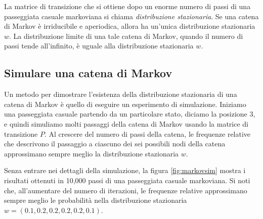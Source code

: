 \documentclass[
]{memoir}
\begin{document}
La matrice di transizione che si ottiene dopo un enorme numero di passi di una passeggiata casuale markoviana si chiama \emph{distribuzione stazionaria}. Se una catena di Markov è irriducibile e aperiodica, allora ha un'unica distribuzione stazionaria \(w\). La distribuzione limite di una tale catena di Markov, quando il numero di passi tende all'infinito, è uguale alla distribuzione stazionaria \(w\).

\hypertarget{simulare-una-catena-di-markov}{%
\subsection{Simulare una catena di Markov}\label{simulare-una-catena-di-markov}}

Un metodo per dimostrare l'esistenza della distribuzione stazionaria di una catena di Markov è quello di eseguire un esperimento di simulazione. Iniziamo una passeggiata casuale partendo da un particolare stato, diciamo la posizione 3, e quindi simuliamo molti passaggi della catena di Markov usando la matrice di transizione \(P\). Al crescere del numero di passi della catena, le frequenze relative che descrivono il passaggio a ciascuno dei sei possibili nodi della catena approssimano sempre meglio la distribuzione stazionaria \(w\).

Senza entrare nei dettagli della simulazione, la figura \ref{fig:markovsim} mostra i risultati ottenuti in 10,000 passi di una passeggiata casuale markoviana. Si noti che, all'aumentare del numero di iterazioni, le frequenze relative approssimano sempre meglio le probabilità nella distribuzione stazionaria \(w = (0.1, 0.2, 0.2, 0.2, 0.2, 0.1)\).
\end{document}
